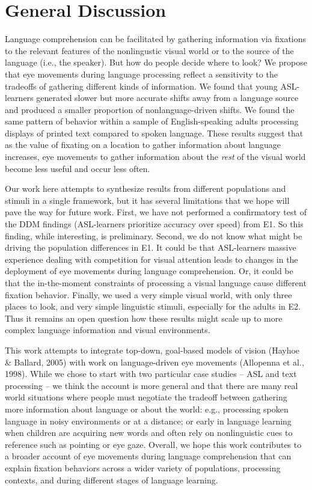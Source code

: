 \documentclass[10pt, letterpaper]{article}
\begin{document}
\section{General Discussion}\label{general-discussion}

Language comprehension can be facilitated by gathering information via
fixations to the relevant features of the nonlingustic visual world or
to the source of the language (i.e., the speaker). But how do people
decide where to look? We propose that eye movements during language
processing reflect a sensitivity to the tradeoffs of gathering different
kinds of information. We found that young ASL-learners generated slower
but more accurate shifts away from a language source and produced a
smaller proportion of nonlanguage-driven shifts. We found the same
pattern of behavior within a sample of English-speaking adults
processing displays of printed text compared to spoken language. These
results suggest that as the value of fixating on a location to gather
information about language increases, eye movements to gather
information about the \emph{rest} of the visual world become less useful
and occur less often.

Our work here attempts to synthesize results from different populations
and stimuli in a single framework, but it has several limitations that
we hope will pave the way for future work. First, we have not performed
a confirmatory test of the DDM findings (ASL-learners prioritize
accuracy over speed) from E1. So this finding, while interesting, is
preliminary. Second, we do not know what might be driving the population
differences in E1. It could be that ASL-learners massive experience
dealing with competition for visual attention leads to changes in the
deployment of eye movements during language comprehension. Or, it could
be that the in-the-moment constraints of processing a visual language
cause different fixation behavior. Finally, we used a very simple visual
world, with only three places to look, and very simple linguistic
stimuli, especially for the adults in E2. Thus it remains an open
question how these results might scale up to more complex language
information and visual environments.

This work attempts to integrate top-down, goal-based models of vision
(Hayhoe \& Ballard, 2005) with work on language-driven eye movements
(Allopenna et al., 1998). While we chose to start with two particular
case studies -- ASL and text processing -- we think the account is more
general and that there are many real world situations where people must
negotiate the tradeoff between gathering more information about language
or about the world: e.g., processing spoken language in noisy
environments or at a distance; or early in language learning when
children are acquiring new words and often rely on nonlinguistic cues to
reference such as pointing or eye gaze. Overall, we hope this work
contributes to a broader account of eye movements during language
comprehension that can explain fixation behaviors across a wider variety
of populations, processing contexts, and during different stages of
language learning.
\end{document}
